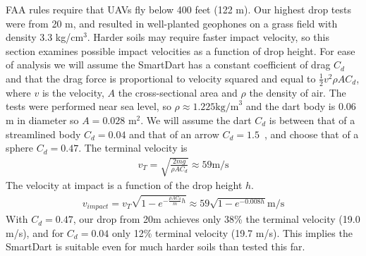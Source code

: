 FAA rules require that UAVs fly below 400 feet (122 m). Our highest drop tests were from 20 m, and resulted in well-planted geophones on a grass field with density 3.3 kg/cm$^3$. Harder soils may require faster impact velocity, so this section examines possible impact velocities as a function of drop height.
For ease of analysis we will assume the SmartDart has a constant coefficient of drag $C_d$ and that the drag force is proportional to velocity squared and equal to $\frac{1}{2} v^2 \rho A C_d$, where $v$ is the velocity, $A$ the cross-sectional area and $\rho$ the density of air.  The tests were performed near sea level, so $\rho \approx 1.225  \text{kg/m}^3$ and the dart body is 0.06 m in diameter so $A=0.028$ m$^2$.  We will assume the dart $C_d$ is between that of a streamlined body $C_d=0.04$ and that of an arrow $C_d=1.5$~\cite{miyazaki2013aerodynamic}, and choose that of a sphere $C_d=0.47$.
The terminal velocity is 
\begin{align}
v_T = \sqrt{\frac{2 m g}{\rho A  C_d}} \approx 59 \text{m/s}
\end{align}
The velocity at impact is a function of the drop height $h$.
\begin{align}
v_{impact} = v_T  \sqrt{ 1 - e^{ -\frac{\rho A  C_d}{m} h }} \approx 59\sqrt{ 1 - e^{ -0.008 h }} \text{m/s}
\end{align}
With  $C_d=0.47$, our drop from 20m achieves only 38\% the terminal velocity (19.0 m/s), and for $C_d=0.04$ only 12\% terminal velocity  (19.7 m/s).
This implies the SmartDart is suitable even for much harder soils than tested this far.

